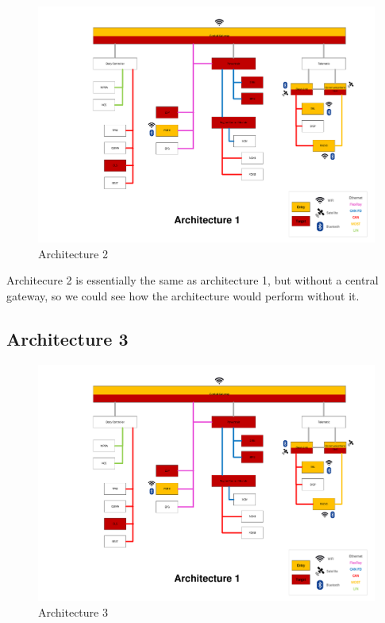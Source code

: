 \begin{figure}[h!]
    \caption{Architecture 2}
    \includegraphics[width=\textwidth, page=2]{../Architectures-survey.pdf}
\end{figure}

Architecure 2 is essentially the same as architecture 1, but without a central gateway, 
so we could see how the architecture would perform without it.\par


\subsection*{Architecture 3}
\label{sec:arch3}

\begin{figure}[h!]
    \caption{Architecture 3}
    \includegraphics[width=\textwidth, page=3]{../Architectures-survey.pdf}
\end{figure}

